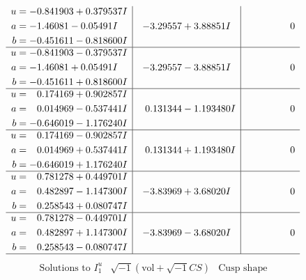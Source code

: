 \documentclass[1p]{elsarticle_modified}
\theoremstyle{definition}
\newcommand{\I}{\sqrt{-1}}
\begin{document}
$$\begin{array}{c|c|c}
\begin{aligned}
u &= -0.841903 + 0.379537 I \\
a &= -1.46081 - 0.05491 I \\
b &= -0.451611 - 0.818600 I\end{aligned}
 & -3.29557 + 3.88851 I & \phantom{-0.000000 } 0 \\ \hline\begin{aligned}
u &= -0.841903 - 0.379537 I \\
a &= -1.46081 + 0.05491 I \\
b &= -0.451611 + 0.818600 I\end{aligned}
 & -3.29557 - 3.88851 I & \phantom{-0.000000 } 0 \\ \hline\begin{aligned}
u &= \phantom{-}0.174169 + 0.902857 I \\
a &= \phantom{-}0.014969 - 0.537441 I \\
b &= -0.646019 - 1.176240 I\end{aligned}
 & \phantom{-}0.131344 - 1.193480 I & \phantom{-0.000000 } 0 \\ \hline\begin{aligned}
u &= \phantom{-}0.174169 - 0.902857 I \\
a &= \phantom{-}0.014969 + 0.537441 I \\
b &= -0.646019 + 1.176240 I\end{aligned}
 & \phantom{-}0.131344 + 1.193480 I & \phantom{-0.000000 } 0 \\ \hline\begin{aligned}
u &= \phantom{-}0.781278 + 0.449701 I \\
a &= \phantom{-}0.482897 - 1.147300 I \\
b &= \phantom{-}0.258543 + 0.080747 I\end{aligned}
 & -3.83969 + 3.68020 I & \phantom{-0.000000 } 0 \\ \hline\begin{aligned}
u &= \phantom{-}0.781278 - 0.449701 I \\
a &= \phantom{-}0.482897 + 1.147300 I \\
b &= \phantom{-}0.258543 - 0.080747 I\end{aligned}
 & -3.83969 - 3.68020 I & \phantom{-0.000000 } 0\\
 \hline 
 \end{array}$$\newpage$$\begin{array}{c|c|c}  
\text{Solutions to }I^u_{1}& \I (\text{vol} + \sqrt{-1}CS) & \text{Cusp shape}\\
 \hline 
\begin{aligned}

\end{aligned}
\end{array}$$
\end{document}
